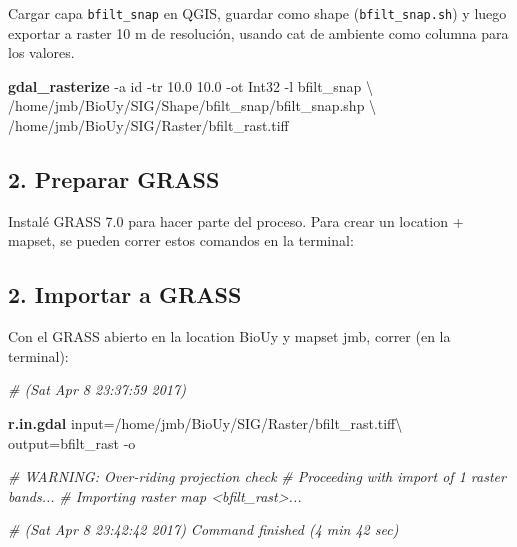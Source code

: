 \documentclass[spanish,]{article}
\newenvironment{Shaded}{}{}
\newcommand{\KeywordTok}[1]{\textcolor[rgb]{0.00,0.44,0.13}{\textbf{{#1}}}}
\newcommand{\CommentTok}[1]{\textcolor[rgb]{0.38,0.63,0.69}{\textit{{#1}}}}
\newcommand{\OtherTok}[1]{\textcolor[rgb]{0.00,0.44,0.13}{{#1}}}
\newcommand{\NormalTok}[1]{{#1}}
\begin{document}
Cargar capa \texttt{bfilt\_snap} en QGIS, guardar como shape
(\texttt{bfilt\_snap.sh}) y luego exportar a raster 10 m de resolución,
usando cat de ambiente como columna para los valores.

\begin{Shaded}
\begin{Highlighting}[]
\KeywordTok{gdal_rasterize} \NormalTok{-a id -tr 10.0 10.0 -ot Int32 -l bfilt_snap \textbackslash{}}
  \NormalTok{/home/jmb/BioUy/SIG/Shape/bfilt_snap/bfilt_snap.shp \textbackslash{}}
  \NormalTok{/home/jmb/BioUy/SIG/Raster/bfilt_rast.tiff}
\end{Highlighting}
\end{Shaded}

\subsection{2. Preparar GRASS}\label{preparar-grass}

Instalé GRASS 7.0 para hacer parte del proceso. Para crear un location +
mapset, se pueden correr estos comandos en la terminal:

\begin{Shaded}
\end{Shaded}

\subsection{2. Importar a GRASS}\label{importar-a-grass}

Con el GRASS abierto en la location BioUy y mapset jmb, correr (en la
terminal):

\begin{Shaded}
\begin{Highlighting}[]
\CommentTok{# (Sat Apr 8 23:37:59 2017)}

\KeywordTok{r.in.gdal} \NormalTok{input=/home/jmb/BioUy/SIG/Raster/bfilt_rast.tiff\textbackslash{}}
 \NormalTok{output=bfilt_rast -o }

\CommentTok{# WARNING: Over-riding projection check}
\CommentTok{# Proceeding with import of 1 raster bands...}
\CommentTok{# Importing raster map <bfilt_rast>...}

\CommentTok{# (Sat Apr  8 23:42:42 2017) Command finished (4 min 42 sec)}
\end{Highlighting}
\end{Shaded}
\end{document}
